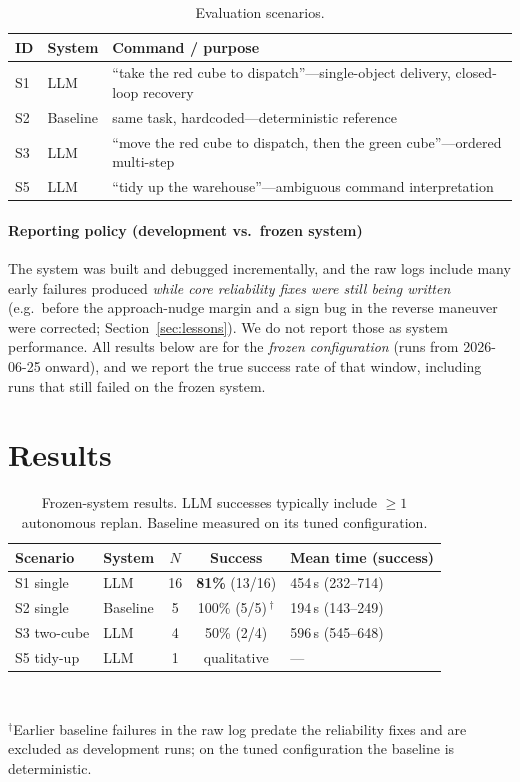 \documentclass[conference]{IEEEtran}
\begin{document}
\begin{table}[t]
\caption{Evaluation scenarios.}
\label{tab:scenarios}
\centering
\small
\begin{tabular}{@{}llp{4.4cm}@{}}
\toprule
ID & System & Command / purpose \\
\midrule
S1 & LLM & ``take the red cube to dispatch''---single-object delivery, closed-loop recovery \\
S2 & Baseline & same task, hardcoded---deterministic reference \\
S3 & LLM & ``move the red cube to dispatch, then the green cube''---ordered multi-step \\
S5 & LLM & ``tidy up the warehouse''---ambiguous command interpretation \\
\bottomrule
\end{tabular}
\end{table}

\paragraph{Reporting policy (development vs.\ frozen system)}
The system was built and debugged incrementally, and the raw logs include many
early failures produced \emph{while core reliability fixes were still being
written} (e.g.\ before the approach-nudge margin and a sign bug in the reverse
maneuver were corrected; Section~\ref{sec:lessons}). We do not report those as
system performance. All results below are for the \emph{frozen configuration}
(runs from 2026-06-25 onward), and we report the true success rate of that window,
including runs that still failed on the frozen system.

\section{Results}\label{sec:results}
\begin{table}[t]
\caption{Frozen-system results. LLM successes typically include $\geq1$ autonomous
replan. Baseline measured on its tuned configuration.}
\label{tab:results}
\centering
\small
\begin{tabular}{@{}llccl@{}}
\toprule
Scenario & System & $N$ & Success & Mean time (success) \\
\midrule
S1 single   & LLM      & 16 & \textbf{81\%} (13/16) & 454\,s (232--714) \\
S2 single   & Baseline & 5  & 100\% (5/5)\,$^\dagger$ & 194\,s (143--249) \\
S3 two-cube & LLM      & 4  & 50\% (2/4)   & 596\,s (545--648) \\
S5 tidy-up  & LLM      & 1  & qualitative  & --- \\
\bottomrule
\end{tabular}
\\[2pt]
\raggedright\footnotesize $^\dagger$Earlier baseline failures in the raw log
predate the reliability fixes and are excluded as development runs; on the tuned
configuration the baseline is deterministic.
\end{table}
\end{document}

